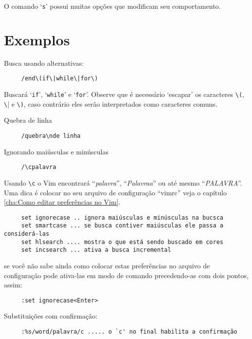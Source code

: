 O comando `{\tt s}' possui muitas opções que modificam seu comportamento.

\section{Exemplos }
\label{Exemplos }

Busca usando alternativas:

\begin{verbatim}
     /end\(if\|while\|for\)
\end{verbatim}

Buscará `{\tt if}', `{\tt while}' e `{\tt for}'.  Observe que é necessário `escapar' os
caracteres \verb|\(|, \verb|\|| e \verb|\)|, caso contrário eles serão
interpretados como caracteres comuns.

Quebra de linha

\begin{verbatim}
     /quebra\nde linha
\end{verbatim}

Ignorando maiúsculas e minúsculas

\begin{verbatim}
     /\cpalavra
\end{verbatim}

Usando \verb|\c| o Vim encontrará ``{\em{palavra}}'', ``{\em{Palavraa}}'' ou
até mesmo ``{\em{PALAVRA}}''. Uma dica é colocar no seu arquivo de
configuração ``vimrc'' veja o capítulo \ref{cha:Como editar preferências no Vim}.

\begin{verbatim}
     set ignorecase .. ignora maiúsculas e minúsculas na bucsca
     set smartcase ... se busca contiver maiúsculas ele passa a considerá-las
     set hlsearch .... mostra o que está sendo buscado em cores
     set incsearch ... ativa a busca incremental
\end{verbatim}

se você não sabe ainda como colocar estas preferências no arquivo de configuração pode
ativa-las em modo de comando precedendo-as com dois pontos, assim:

\begin{verbatim}
     :set ignorecase<Enter>
\end{verbatim}

Substituições com confirmação:

\begin{verbatim}
     :%s/word/palavra/c ..... o `c' no final habilita a confirmação
\end{verbatim}


